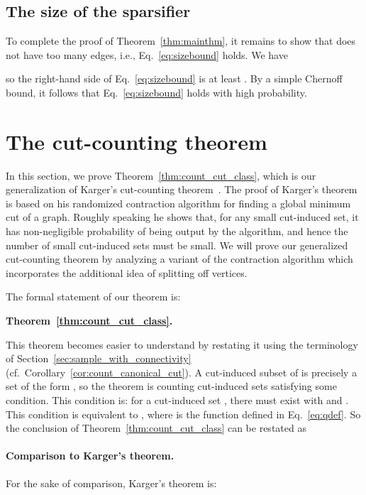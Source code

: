 \documentclass[11pt]{article}
\numberwithin{equation}{section}
\newcommand{\Corollary}[1]{Corollary~\ref{cor:#1}}
\newcommand{\Equation}[1]{Eq.~\eqref{eq:#1}}
\newcommand{\SectionName}[1]{\label{sec:#1}}
\newcommand{\Section}[1]{Section~\ref{sec:#1}}
\newcommand{\Theorem}[1]{Theorem~\ref{thm:#1}}
\begin{document}
\subsection{The size of the sparsifier}

To complete the proof of \Theorem{mainthm},
it remains to show that  does not have too many edges,
i.e., \Equation{sizebound} holds.
We have

so the right-hand side of \Equation{sizebound} is at least .
By a simple Chernoff bound, it follows that \Equation{sizebound} holds with high probability.




\section{The cut-counting theorem}
\SectionName{splitting_off_alg}

In this section, we prove \Theorem{count_cut_class}, which is our
generalization of Karger's cut-counting theorem~\cite{KargerContract,KargerStein}.
The proof of Karger's theorem is based on his randomized contraction algorithm for
finding a global minimum cut of a graph.
Roughly speaking he shows that, for any small cut-induced set, it has non-negligible probability
of being output by the algorithm, and hence the number of small cut-induced sets must be small.
We will prove our generalized cut-counting theorem by analyzing a variant of the contraction
algorithm which incorporates the additional idea of splitting off vertices.

The formal statement of our theorem is:

\medskip
\noindent\textbf{\Theorem{count_cut_class}.~}{\it \thmcountcutclass}

This theorem becomes easier to understand by restating it using the terminology of 
\Section{sample_with_connectivity} (cf.~\Corollary{count_canonical_cut}).
A cut-induced subset of  is precisely a set of the form
, so the theorem is counting cut-induced sets
satisfying some condition.
This condition is: for a cut-induced set ,
there must exist  with 
and .
This condition is equivalent to ,
where  is the function defined in \Equation{qdef}.
So the conclusion of \Theorem{count_cut_class} can be restated as





\paragraph{Comparison to Karger's theorem.}
For the sake of comparison, Karger's theorem is:
\end{document}
